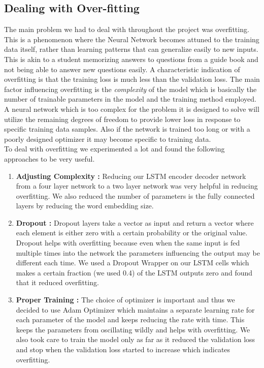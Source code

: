 \documentclass[12pt]{article}
\begin{document}
\subsection{Dealing with Over-fitting}

The main problem we had to deal with throughout the project was overfitting. This is a phenomenon where the Neural Network becomes attuned to the training data itself, rather than learning patterns that can generalize easily to new inputs. This is akin to a student memorizing answers to questions from a guide book and not being able to answer new questions easily. A characteristic indication of overfitting is that the training loss is much less than the validation loss. The main factor influencing overfitting is the \textit{complexity} of the model which is basically the number of trainable parameters in the model and the training method employed. A neural network which is too complex for the problem it is designed to solve will utilize the remaining degrees of freedom to provide lower loss in response to specific training data samples. Also if the network is trained too long or with a poorly designed optimizer it may become specific to training data.\\

To deal with overfitting we experimented a lot and found the following approaches to be very useful. 
\begin{enumerate}
\item \textbf{Adjusting Complexity :} Reducing our LSTM encoder decoder network from a four layer network to a two layer network was very helpful in reducing overfitting. We also reduced the number of parameters is the fully connected layers by reducing the word embedding size.  
\item \textbf{Dropout :} Dropout layers take a vector as input and return a vector where each element is either zero with a certain probability or the original value. Dropout helps with overfitting because even  when the same input is fed multiple times into the network the parameters influencing the output may be different each time. We used a Dropout Wrapper on our LSTM cells which makes a certain fraction (we used 0.4) of the LSTM outputs zero and found that it reduced overfitting.
\item \textbf{Proper Training :} The choice of optimizer is important and thus we decided to use Adam Optimizer which maintains a separate learning rate for each parameter of the model and keeps reducing the rate with time. This keeps the parameters from oscillating wildly and helps with overfitting. We also took care to train the model only as far as it reduced the validation loss and stop when the validation loss started to increase which indicates overfitting.

\end{enumerate}
\end{document}

